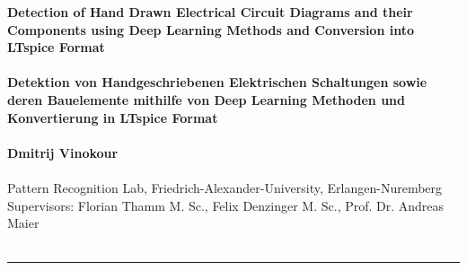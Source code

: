 \documentclass{article} %
\begin{document}
\begin{center}

\textbf{
\huge{Detection of Hand Drawn Electrical Circuit Diagrams and their Components using Deep Learning Methods and Conversion into LTspice Format}
\\~\\
\large{Detektion von Handgeschriebenen Elektrischen Schaltungen sowie deren Bauelemente mithilfe von Deep Learning Methoden und Konvertierung in LTspice Format}
\\~\\
Dmitrij Vinokour
\\~\\
}
Pattern Recognition Lab, Friedrich-Alexander-University, Erlangen-Nuremberg
\\
Supervisors: Florian Thamm M. Sc., Felix Denzinger M. Sc., Prof. Dr. Andreas Maier
\\~\\
\noindent\rule{\textwidth}{1pt}
\end{center}






\end{document}
